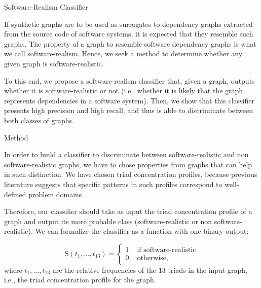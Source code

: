 \documentclass[11pt,twocolumn,a4paper,english]{article}
\begin{document}
\begin{section}{Software-Realism Classifier} \label{sec:sr}

	If synthetic graphs are to be used as surrogates to dependency graphs extracted from the source code of software systems, it is expected that they resemble such graphs. The property of a graph to resemble software dependency graphs is what we call software-realism. Hence, we seek a method to determine whether any given graph is software-realistic. %
	
	To this end, we propose a software-realism classifier that, given a graph, outputs whether it is software-realistic or not (i.e., whether it is likely that the graph represents dependencies in a software system). Then, we show that this classifier presents high precision and high recall, and thus is able to discriminate between both classes of graphs. %
		
\begin{subsection}{Method}

In order to build a classifier to discriminate between software-realistic and non software-realistic graphs, we have to chose properties from graphs that can help in such distinction. We have chosen triad concentration profiles, because previous literature suggests that specific patterns in such profiles correspond to well-defined problem domains \cite{Milo2004}.

Therefore, our classifier should take as input the triad concentration profile of a graph and output its more probable class (software-realistic or non software-realistic). We can formalize the classifier as a function with one binary output:

$$
  \mathrm{S}(t_1, \ldots, t_{13}) = \left\{ \begin{array}{rl}
	 1 &\mbox{ if software-realistic} \\
	 0 &\mbox{ otherwise,}
	       \end{array} \right.
$$
where $t_1, \ldots, t_{13}$ are the relative frequencies of the 13 triads in the input graph, i.e., the triad concentration profile for the graph.


\end{subsection}
\end{section}
\end{document}
